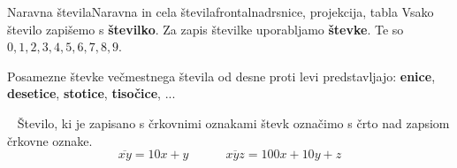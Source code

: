 \begin{priprava}{1}{}{Naravna števila}{Naravna in cela števila}{frontalna}{drsnice, projekcija, tabla}
Vsako število zapišemo s \textbf{številko}. 
Za zapis številke uporabljamo \textbf{števke}. Te so $0, 1, 2, 3, 4, 5, 6, 7, 8, 9$.



Posamezne števke večmestnega števila od desne proti levi predstavljajo: \textbf{enice}, \textbf{desetice}, \textbf{stotice}, \textbf{tisočice}, ...


~\newline
Število, ki je zapisano s črkovnimi oznakami števk označimo s črto nad zapsiom črkovne oznake.
$$ \overline{xy}=10x+y \quad \quad \quad \overline{xyz}=100x+10y+z$$




\end{priprava}